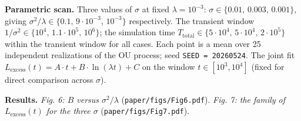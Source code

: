 \documentclass[pdflatex,sn-mathphys-ay]{sn-jnl}
\begin{document}
\textbf{Parametric scan.} Three values of \(\sigma\) at fixed \(\lambda = 10^{-3}\): \(\sigma \in \{0.01,\, 0.003,\, 0.001\}\), giving \(\sigma^2/\lambda \in \{0.1,\, 9 \cdot 10^{-3},\, 10^{-3}\}\) respectively. The transient window \(1/\sigma^2 \in \{10^4,\, 1.1\cdot 10^5,\, 10^6\}\); the simulation time \(T_{\text{total}} \in \{5\cdot 10^4,\, 5\cdot 10^4,\, 2\cdot 10^5\}\) within the transient window for all cases. Each point is a mean over 25 independent realizations of the OU process; seed \texttt{SEED\ =\ 20260524}. The joint fit \(L_{\text{excess}}(t) = A \cdot t + B \cdot \ln(\lambda t) + C\) on the window \(t \in [10^3, 10^4]\) (fixed for direct comparison across \(\sigma\)).



\textbf{Results.} \emph{Fig. 6: \(B\) versus \(\sigma^2/\lambda\)} (\texttt{paper/figs/Fig6.pdf}). \emph{Fig. 7: the family of \(L_{\text{excess}}(t)\) for the three \(\sigma\)} (\texttt{paper/figs/Fig7.pdf}).
\end{document}
